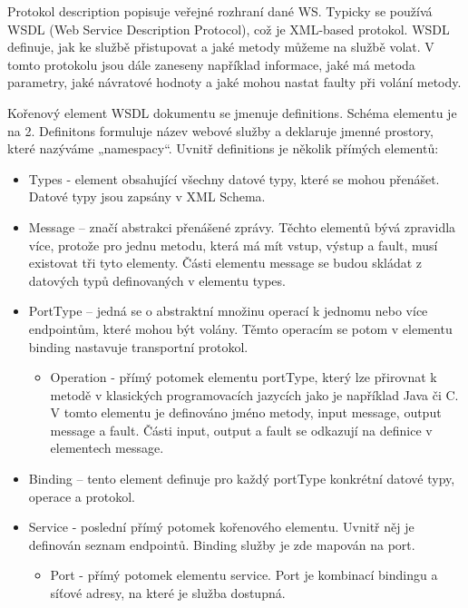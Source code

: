 \documentclass[11pt,twoside,a4paper]{book}
\begin{document}
Protokol description popisuje veřejné rozhraní dané WS. Typicky se používá WSDL (Web
Service Description Protocol), což je XML-based protokol. WSDL definuje, jak ke službě
přistupovat a jaké metody můžeme na službě volat. V tomto protokolu jsou dále zaneseny
například informace, jaké má metoda parametry, jaké návratové hodnoty a jaké mohou nastat
faulty při volání metody.

Kořenový element WSDL dokumentu se jmenuje definitions. Schéma elementu je na 2.
Definitons formuluje název webové služby a deklaruje jmenné prostory, které nazýváme
„namespacy“. Uvnitř definitions je několik přímých elementů:

\begin{itemize}
  \item Types - element obsahující všechny datové typy, které se mohou přenášet. Datové
typy jsou zapsány v XML Schema.

  \item Message – značí abstrakci přenášené zprávy. Těchto elementů bývá zpravidla více,
protože pro jednu metodu, která má mít vstup, výstup a fault, musí existovat tři tyto
elementy. Části elementu message se budou skládat z datových typů definovaných v
 elementu types. 

  \item PortType – jedná se o abstraktní množinu operací k jednomu nebo více endpointům,
které mohou být volány. Těmto operacím se potom v elementu binding nastavuje
transportní protokol.

  \begin{itemize}
    \item Operation - přímý potomek elementu portType, který lze přirovnat k metodě v
klasických programovacích jazycích jako je například Java či C. V tomto
elementu je definováno jméno metody, input message, output message a fault.
Části input, output a fault se odkazují na definice v elementech message.

  \end{itemize}
  \item Binding – tento element definuje pro každý portType konkrétní datové typy, operace
a protokol.

  \item Service - poslední přímý potomek kořenového elementu. Uvnitř něj je definován
seznam endpointů. Binding služby je zde mapován na port.

  \begin{itemize}
    \item Port - přímý potomek elementu service. Port je kombinací bindingu a síťové
adresy, na které je služba dostupná.

  \end{itemize}
\end{itemize}
\end{document}
